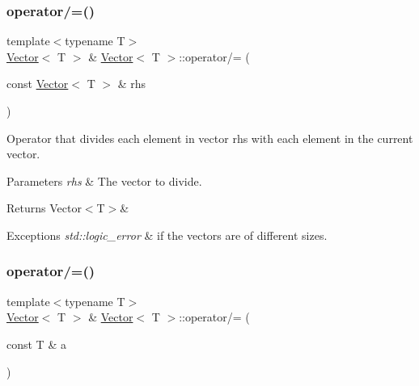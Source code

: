 \subsubsection{\texorpdfstring{operator/=()}{operator/=()}\hspace{0.1cm}{\footnotesize\ttfamily [1/2]}}
{\footnotesize\ttfamily template$<$typename T$>$ \\
\mbox{\hyperlink{classVector}{Vector}}$<$ T $>$ \& \mbox{\hyperlink{classVector}{Vector}}$<$ T $>$\+::operator/= (\begin{DoxyParamCaption}\item[{const \mbox{\hyperlink{classVector}{Vector}}$<$ T $>$ \&}]{rhs }\end{DoxyParamCaption})\hspace{0.3cm}{\ttfamily [inline]}}



Operator that divides each element in vector {\ttfamily rhs} with each element in the current vector. 


\begin{DoxyParams}{Parameters}
{\em rhs} & The vector to divide. \\
\hline
\end{DoxyParams}
\begin{DoxyReturn}{Returns}
Vector$<$\+T$>$\&
\end{DoxyReturn}

\begin{DoxyExceptions}{Exceptions}
{\em std\+::logic\+\_\+error} & if the vectors are of different sizes. \\
\hline
\end{DoxyExceptions}
\mbox{\label{classVector_a358eca4649d02b3bbab359484eb93140}} 
\subsubsection{\texorpdfstring{operator/=()}{operator/=()}\hspace{0.1cm}{\footnotesize\ttfamily [2/2]}}
{\footnotesize\ttfamily template$<$typename T$>$ \\
\mbox{\hyperlink{classVector}{Vector}}$<$ T $>$ \& \mbox{\hyperlink{classVector}{Vector}}$<$ T $>$\+::operator/= (\begin{DoxyParamCaption}\item[{const T \&}]{a }\end{DoxyParamCaption})\hspace{0.3cm}{\ttfamily [inline]}}



